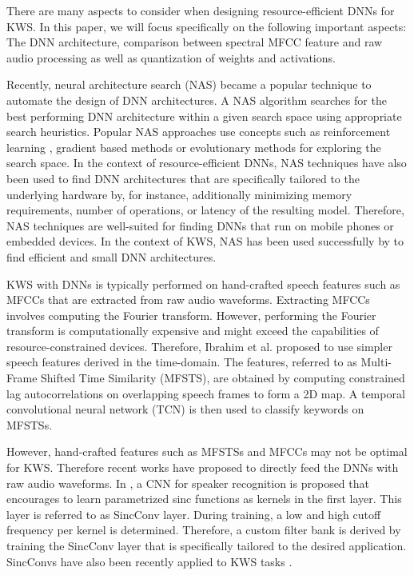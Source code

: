\documentclass[a4paper]{article}
\begin{document}
There are many aspects to consider when designing resource-efficient DNNs for KWS. In this paper, we will focus specifically on the following important aspects: The DNN architecture, comparison between spectral MFCC feature and raw audio processing as well as quantization of weights and activations.

Recently, neural architecture search (NAS) became a popular technique to automate the design of DNN architectures. A NAS algorithm searches for the best performing DNN architecture within a given search space using appropriate search heuristics. Popular NAS approaches use concepts such as reinforcement learning \cite{Pham2018}, gradient based methods \cite{Liu2019} or evolutionary methods \cite{Liu2018} for exploring the search space. In the context of resource-efficient DNNs, NAS techniques have also been used to find DNN architectures that are specifically tailored to the underlying hardware \cite{Cai2019,Tan2019} by, for instance, additionally minimizing memory requirements, number of operations, or latency of the resulting model. Therefore, NAS techniques are well-suited for finding DNNs that run on mobile phones or embedded devices. In the context of KWS, NAS has been used successfully by \cite{Peter2020,Mo2020} to find efficient and small DNN architectures.

KWS with DNNs is typically performed on hand-crafted speech features such as MFCCs that are extracted from raw audio waveforms. Extracting MFCCs involves computing the Fourier transform. However, performing the Fourier transform is computationally expensive and might exceed the capabilities of resource-constrained devices. Therefore, Ibrahim et al. \cite{Ibrahim2019} proposed to use simpler speech features derived in the time-domain. The features, referred to as Multi-Frame Shifted Time Similarity (MFSTS), are obtained by computing constrained lag autocorrelations on overlapping speech frames to form a 2D map. A temporal convolutional neural network (TCN) \cite{Chiu2018} is then used to classify keywords on MFSTSs. 

However, hand-crafted features such as MFSTSs and MFCCs may not be optimal for KWS. Therefore recent works have proposed to directly feed the DNNs with raw audio waveforms. In \cite{Ravanelli2018}, a CNN for speaker recognition is proposed that encourages to learn parametrized sinc functions as kernels in the first layer. This layer is referred to as SincConv layer. During training, a low and high cutoff frequency per kernel is determined. Therefore, a custom filter bank is derived by training the SincConv layer that is specifically tailored to the desired application. SincConvs have also been recently applied to KWS tasks \cite{Mittermaier2020}.
\end{document}
